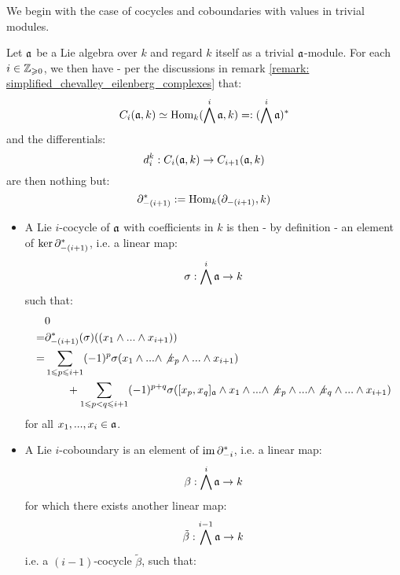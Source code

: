        We begin with the case of cocycles and coboundaries with values in trivial modules. 
        \begin{example} \label{example: lie_cocycles_and_coboundaries_with_trivial_coefficients}
            Let $\a$ be a Lie algebra over $k$ and regard $k$ itself as a trivial $\a$-module. For each $i \in \Z_{\geq 0}$, we then have - per the discussions in remark \ref{remark: simplified_chevalley_eilenberg_complexes} that:
                $$C_i(\a, k) \cong \Hom_k(\bigwedge^i \a, k) =: (\bigwedge^i \a)^*$$
            and the differentials:
                $$d_i^k: C_i(\a, k) \to C_{i + 1}(\a, k)$$
            are then nothing but:
                $$\del_{-(i + 1)}^* := \Hom_k(\del_{-(i + 1)}, k)$$
            \begin{itemize}
                \item A Lie $i$-cocycle of $\a$ with coefficients in $k$ is then - by definition - an element of $\ker \del_{-(i + 1)}^*$, i.e. a linear map:
                    $$\sigma: \bigwedge^i \a \to k$$
                such that:
                    $$
                        \begin{aligned}
                            & 0
                            \\
                            = & \del_{-(i + 1)}^*(\sigma)( (x_1 \wedge ... \wedge x_{i + 1}) )
                            \\
                            = &
                                \sum_{1 \leq p \leq i + 1} (-1)^p \sigma(x_1 \wedge ... \wedge \not{x_p} \wedge ... \wedge x_{i + 1})
                                \\
                                & \qquad + \sum_{1 \leq p < q \leq i + 1} (-1)^{p + q} \sigma( [x_p, x_q]_{\a} \wedge x_1 \wedge ... \wedge \not{x_p} \wedge ... \wedge \not{x_q} \wedge ... \wedge x_{i + 1})
                        \end{aligned}
                    $$
                for all $x_1, ..., x_i \in \a$.
                \item A Lie $i$-coboundary is an element of $\im \del_{-i}^*$, i.e. a linear map:
                    $$\beta: \bigwedge^i \a \to k$$
                for which there exists another linear map:
                    $$\tilde{\beta}: \bigwedge^{i - 1} \a \to k$$
                i.e. a $(i - 1)$-cocycle $\tilde{\beta}$, such that:
                    $$
                        \begin{aligned}

\end{aligned}$$
\end{itemize}
\end{example}
